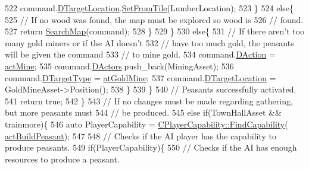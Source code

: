 \begin{DoxyCode}
522                     command.\hyperlink{structSPlayerCommandRequest_a701702b94ca2fd2738e95ef6711dd41a}{DTargetLocation}.\hyperlink{classCPosition_a46994e6a8b8e3b4237edd7259ad844b6}{SetFromTile}(LumberLocation);
523                 \}
524                 \textcolor{keywordflow}{else}\{
525                     \textcolor{comment}{// If no wood was found, the map must be explored so wood is}
526                     \textcolor{comment}{// found.}
527                     \textcolor{keywordflow}{return} \hyperlink{classCAIPlayer_afafbe8fc589e09a16ae1f02f2794d7b0}{SearchMap}(command);
528                 \}
529             \}
530             \textcolor{keywordflow}{else}\{
531                 \textcolor{comment}{// If there aren't too many gold miners or if the AI doesn't }
532                 \textcolor{comment}{// have too much gold, the peasants will be given the command}
533                 \textcolor{comment}{// to mine gold.}
534                 command.\hyperlink{structSPlayerCommandRequest_a80897bbccf2c4e0b148a7aa815a926c6}{DAction} = \hyperlink{GameDataTypes_8h_a35b98ce26aca678b03c6f9f76e4778cea2e0db284fd05caa56e3867c661ccdd8b}{actMine};
535                 command.\hyperlink{structSPlayerCommandRequest_aa37fc01519676345703d78b9f573894a}{DActors}.push\_back(MiningAsset);
536                 command.\hyperlink{structSPlayerCommandRequest_a864e47c641127665751091876a6d3c5e}{DTargetType} = \hyperlink{GameDataTypes_8h_a5600d4fc433b83300308921974477feca243d9ba44092eadd561db058d742b3b3}{atGoldMine};
537                 command.\hyperlink{structSPlayerCommandRequest_a701702b94ca2fd2738e95ef6711dd41a}{DTargetLocation} = GoldMineAsset->Position();
538             \}
539         \}
540         \textcolor{comment}{// Peasants successfully activated.}
541         \textcolor{keywordflow}{return} \textcolor{keyword}{true};
542     \}
543     \textcolor{comment}{// If no changes must be made regarding gathering, but more peasants must}
544     \textcolor{comment}{// be produced.}
545     \textcolor{keywordflow}{else} \textcolor{keywordflow}{if}(TownHallAsset && trainmore)\{
546         \textcolor{keyword}{auto} PlayerCapability = \hyperlink{classCPlayerCapability_a881ba4b87385d7cfe5cb6ced2d26f226}{CPlayerCapability::FindCapability}(
      \hyperlink{GameDataTypes_8h_a35b98ce26aca678b03c6f9f76e4778cea66c601dce0fc095460b3c2c25f66ee71}{actBuildPeasant}); 
547         
548         \textcolor{comment}{// Checks if the AI player has the capability to produce peasants.}
549         \textcolor{keywordflow}{if}(PlayerCapability)\{
550             \textcolor{comment}{// Checks if the AI has enough resources to produce a peasant.}

\end{DoxyCode}
